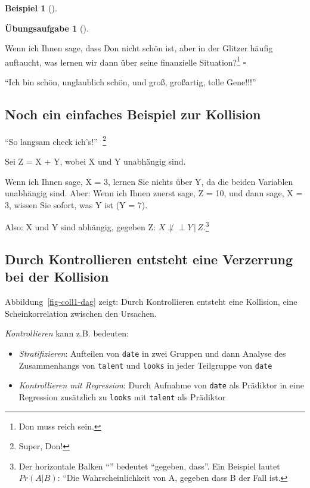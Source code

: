\documentclass[
  ngerman,
  letterpaper,
  twoside,
  open=any]{scrbook}
\providecommand{\tightlist}{%
  \setlength{\itemsep}{0pt}\setlength{\parskip}{0pt}}\usepackage{longtable,booktabs,array}
\theoremstyle{definition}
\newtheorem{example}{Beispiel}[chapter]
\theoremstyle{plain}
\theoremstyle{definition}
\newtheorem{exercise}{Übungsaufgabe}[chapter]
\theoremstyle{definition}
\theoremstyle{remark}
\begin{document}
\begin{example}[]
\begin{exercise}[]\protect\hypertarget{exr-coll1}{}\label{exr-coll1}

Wenn ich Ihnen sage, dass Don nicht schön ist, aber in der Glitzer
häufig auftaucht, was lernen wir dann über seine finanzielle
Situation?\footnote{Don muss reich sein.} \(\square\)

\end{exercise}

\begin{displayquote}
\enquote{Ich bin schön, unglaublich schön, und groß, großartig, tolle
Gene!!!} 🧑
\end{displayquote}

\subsection{Noch ein einfaches Beispiel zur
Kollision}\label{noch-ein-einfaches-beispiel-zur-kollision}

\begin{displayquote}
\enquote{So langsam check ich's!} 🧑\footnote{Super, Don!}
\end{displayquote}

Sei Z = X + Y, wobei X und Y unabhängig sind.

Wenn ich Ihnen sage, X = 3, lernen Sie nichts über Y, da die beiden
Variablen unabhängig sind. Aber: Wenn ich Ihnen zuerst sage, Z = 10, und
dann sage, X = 3, wissen Sie sofort, was Y ist (Y = 7).

Also: X und Y sind abhängig, gegeben Z:
\(X \not\perp \!\!\! \perp Y \,|\, Z\).\footnote{Der horizontale Balken
  \enquote{\textbar{}} bedeutet \enquote{gegeben, dass}. Ein Beispiel
  lautet \(Pr(A|B)\): ``Die Wahrscheinlichkeit von A, gegeben dass B der
  Fall ist.}

\subsection{Durch Kontrollieren entsteht eine Verzerrung bei der
Kollision}\label{durch-kontrollieren-entsteht-eine-verzerrung-bei-der-kollision}

Abbildung~\ref{fig-coll1-dag} zeigt: Durch Kontrollieren entsteht eine
Kollision, eine Scheinkorrelation zwischen den Ursachen.

\emph{Kontrollieren} kann z.B. bedeuten:

\begin{itemize}
\tightlist
\item
  \emph{Stratifizieren}: Aufteilen von \texttt{date} in zwei Gruppen und
  dann Analyse des Zusammenhangs von \texttt{talent} und \texttt{looks}
  in jeder Teilgruppe von \texttt{date}
\item
  \emph{Kontrollieren mit Regression}: Durch Aufnahme von \texttt{date}
  als Prädiktor in eine Regression zusätzlich zu \texttt{looks} mit
  \texttt{talent} als Prädiktor
\end{itemize}


\end{example}
\end{document}
